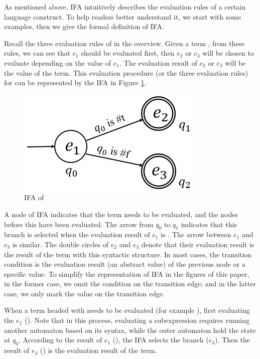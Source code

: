 As mentioned above, IFA intuitively describes the evaluation rules of a certain language construct. To help readers better understand it, we start with some examples, then we give the formal definition of IFA.

\begin{example}[IFA of~~ \m{if}]

Recall the three evaluation rules of  in the overview. Given a term , from these rules, we can see that $e_1$ should be evaluated first, then $e_2$ or $e_3$ will be chosen to evaluate depending on the value of $e_1$. The evaluation result of $e_2$ or $e_3$ will be the value of the term. This evaluation procedure (or the three evaluation rules) for  can be represented by the IFA in Figure \ref{fig:ifa-if}.

\begin{figure}[t]
    \centering
    \includegraphics[scale=0.25]{images/ifa/ifa-if.png}
    \caption{IFA of }
    \label{fig:ifa-if}
\end{figure}

A node of IFA indicates that the term needs to be evaluated, and the nodes before this have been evaluated. The arrow from $q_0$ to $q_1$ indicates that this branch is selected when the evaluation result of $e_1$ is . The arrow between $e_1$ and $e_3$ is similar. The double circles of $e_2$ and $e_3$ denote that their evaluation result is the result of the term with this syntactic structure. In most cases, the transition condition is the evaluation result (an abstract value) of the previous node or a specific value. To simplify the representation of IFA in the figures of this paper, in the former case, we omit the condition on the transition edge; and in the latter case, we only mark the value on the transition edge.

When a term headed with  needs to be evaluated (for example ), first evaluating the $e_1$ (). Note that in this process, evaluating a subexpression requires running another automaton based on its syntax, while the outer automaton hold the state at $q_0$. According to the result of $e_1$ (), the IFA selects the branch ($e_3$). Then the result of $e_3$ () is the evaluation result of the term.
\myend
\end{example}

